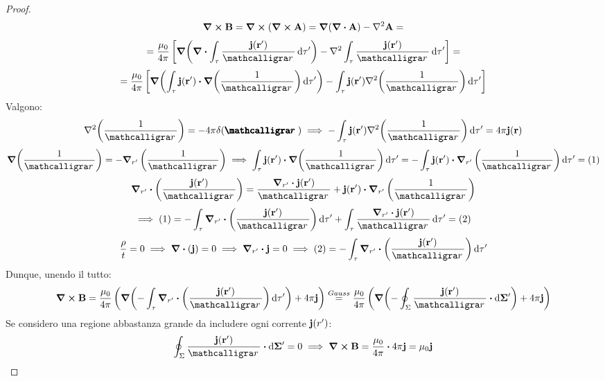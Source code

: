 \documentclass[12pt,a4paper]{article}
\begin{document}
\begin{proof}
    \begin{equation*}
        \curl{\vb{B}}= \curl(\curl{\vb{A}})= \grad(\div \vb{A})-\laplacian{\vb{A}}=
    \end{equation*}
    \begin{equation*}
        =\frac{\mu_0}{4\pi}\left[ \grad(\div{\int_\tau\frac{\vb{j}(\vb{r'})}{\scriptr}\dd{\tau'}})
        -\laplacian{\int_\tau\frac{\vb{j}(\vb{r'})}{\scriptr}\dd{\tau'}} \right]=
    \end{equation*}
    \begin{equation*}
        =\frac{\mu_0}{4\pi}\left[ \grad(\int_\tau\vb{j}(\vb{r'})\vdot\grad( \frac{1}{\scriptr})\dd{\tau'})
        -\int_\tau\vb{j}(\vb{r'})\laplacian(\frac{1}{\scriptr})\dd{\tau'} \right]
    \end{equation*}
    Valgono:
    \begin{equation*}
        \laplacian(\frac{1}{\scriptr})= -4\pi\delta(\boldscriptr) \implies
        -\int_\tau\vb{j}(\vb{r'})\laplacian(\frac{1}{\scriptr})\dd{\tau'} = 4\pi\vb{j}(\vb{r})
    \end{equation*}
    \begin{equation*}
        \grad(\frac{1}{\scriptr}) = -\grad_{r'}\left( \frac{1}{\scriptr} \right)\implies \int_\tau\vb{j}(\vb{r'})\vdot\grad( \frac{1}{\scriptr})\dd{\tau'}
        = - \int_\tau\vb{j}(\vb{r'})\vdot\grad_{r'}\left( \frac{1}{\scriptr}\right)\dd{\tau'} = (1)
    \end{equation*}
    \begin{equation*}
        \grad_{r'}\vdot\left( \frac{\vb{j}(\vb{r}')}{\scriptr} \right)= \frac{\grad_{r'}\vdot\vb{j}(\vb{r}')}{\scriptr}+ \vb{j}(\vb{r}')\vdot\grad_{r'}\left( \frac{1}{\scriptr}\right)
    \end{equation*}
    \begin{equation*}
        \implies (1)= - \int_\tau\grad_{r'}\vdot\left( \frac{\vb{j}(\vb{r}')}{\scriptr} \right)\dd{\tau'}+ \int_\tau\frac{\grad_{r'}\vdot\vb{j}(\vb{r}')}{\scriptr}\dd{\tau'}= (2)
    \end{equation*}
    \begin{equation*}
        \frac{\rho}{t}= 0 \implies\div(\vb{j})= 0 \implies \grad_{r'}\vdot\vb{j}=0\implies
        (2)=- \int_\tau\grad_{r'}\vdot\left( \frac{\vb{j}(\vb{r}')}{\scriptr} \right)\dd{\tau'}
    \end{equation*}
    Dunque, unendo il tutto:
    \begin{equation*}
        \curl{\vb{B}}= \frac{\mu_0}{4\pi}\left( \grad(- \int_\tau\grad_{r'}\vdot\left( \frac{\vb{j}(\vb{r}')}{\scriptr} \right)\dd{\tau'}) + 4\pi\vb{j}\right)
        \overset{Gauss}{=} \frac{\mu_0}{4\pi}\left( \grad(-\oint_\Sigma \frac{\vb{j}(\vb{r}')}{\scriptr}\vdot \dd{\vb{\Sigma}'}) +4\pi\vb{j} \right)
    \end{equation*}
    Se considero una regione abbastanza grande da includere ogni corrente $\vb{j}(r')$:
    \begin{equation*}
        \oint_\Sigma \frac{\vb{j}(\vb{r}')}{\scriptr}\vdot \dd{\vb{\Sigma}'}= 0
        \implies \curl{\vb{B}}= \frac{\mu_0}{4\pi} \vdot4\pi\vb{j}= \mu_0\vb{j}
    \end{equation*}
\end{proof}
\end{document}
